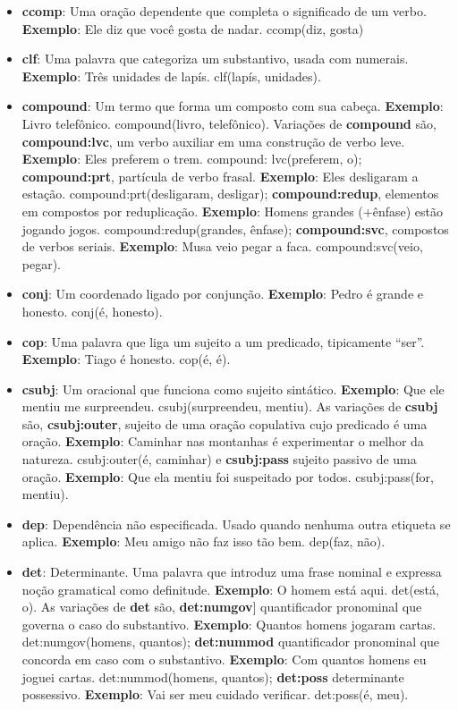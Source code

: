 \begin{itemize}
\item\textbf{ccomp}: Uma oração dependente que completa o significado de um verbo. \textbf{Exemplo}: Ele diz que você gosta de nadar. ccomp(diz, gosta)

\item\textbf{clf}: Uma palavra que categoriza um substantivo, usada com numerais. \textbf{Exemplo}: Três unidades de lapís. clf(lapís, unidades).

\item\textbf{compound}: Um termo que forma um composto com sua cabeça. \textbf{Exemplo}: Livro telefônico. compound(livro, telefônico). Variações de \textbf{compound} são, \textbf{compound:lvc}, um verbo auxiliar em uma construção de verbo leve. \textbf{Exemplo}: Eles preferem o trem. compound: lvc(preferem, o); \textbf{compound:prt}, partícula de verbo frasal. \textbf{Exemplo}: Eles desligaram a estação. compound:prt(desligaram, desligar); \textbf{compound:redup}, elementos em compostos por reduplicação. \textbf{Exemplo}: Homens grandes (+ênfase) estão jogando jogos. compound:redup(grandes, ênfase); \textbf{compound:svc}, compostos de verbos seriais. \textbf{Exemplo}: Musa veio pegar a faca. compound:svc(veio, pegar).

\item\textbf{conj}: Um coordenado ligado por conjunção. \textbf{Exemplo}: Pedro é grande e honesto. conj(é, honesto).

\item\textbf{cop}: Uma palavra que liga um sujeito a um predicado, tipicamente ``ser''. \textbf{Exemplo}: Tiago é honesto. cop(é, é).

\item\textbf{csubj}: Um oracional que funciona como sujeito sintático. \textbf{Exemplo}: Que ele mentiu me surpreendeu. csubj(surpreendeu, mentiu). As variações de \textbf{csubj} são, \textbf{csubj:outer}, sujeito de uma oração copulativa cujo predicado é uma oração. \textbf{Exemplo}: Caminhar nas montanhas é experimentar o melhor da natureza. csubj:outer(é, caminhar) e \textbf{csubj:pass} sujeito passivo de uma oração. \textbf{Exemplo}: Que ela mentiu foi suspeitado por todos. csubj:pass(for, mentiu).

\item\textbf{dep}: Dependência não especificada. Usado quando nenhuma outra etiqueta se aplica. \textbf{Exemplo}: Meu amigo não faz isso tão bem. dep(faz, não).

\item\textbf{det}: Determinante. Uma palavra que introduz uma frase nominal e expressa noção gramatical como definitude. \textbf{Exemplo}: O homem está aqui. det(está, o). As variações de \textbf{det} são, \textbf{det:numgov}] quantificador pronominal que governa o caso do substantivo. \textbf{Exemplo}: Quantos homens jogaram cartas. det:numgov(homens, quantos); \textbf{det:nummod} quantificador pronominal que concorda em caso com o substantivo. \textbf{Exemplo}: Com quantos homens eu joguei cartas. det:nummod(homens, quantos); \textbf{det:poss} determinante possessivo. \textbf{Exemplo}: Vai ser meu cuidado verificar. det:poss(é, meu).


\end{itemize}
